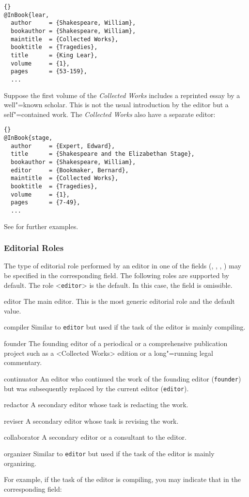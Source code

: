 \documentclass{ltxdockit}[2011/03/25]
\begin{document}
\begin{lstlisting}[style=bibtex]{}
@InBook{lear,
  author     = {Shakespeare, William},
  bookauthor = {Shakespeare, William},
  maintitle  = {Collected Works},
  booktitle  = {Tragedies},
  title      = {King Lear},
  volume     = {1},
  pages      = {53-159},
  ...
\end{lstlisting}
%
Suppose the first volume of the \emph{Collected Works} includes a reprinted essay by a well"=known scholar. This is not the usual introduction by the editor but a self"=contained work. The \emph{Collected Works} also have a separate editor:

\begin{lstlisting}[style=bibtex]{}
@InBook{stage,
  author     = {Expert, Edward},
  title      = {Shakespeare and the Elizabethan Stage},
  bookauthor = {Shakespeare, William},
  editor     = {Bookmaker, Bernard},
  maintitle  = {Collected Works},
  booktitle  = {Tragedies},
  volume     = {1},
  pages      = {7-49},
  ...
\end{lstlisting}
%
See  for further examples.

\subsubsection{Editorial Roles}
\label{bib:use:edr}

The type of editorial role performed by an editor in one of the  fields (\ie {}, , , ) may be specified in the corresponding  field. The following roles are supported by default. The role <\texttt{editor}> is the default. In this case, the  field is omissible.

\begin{marglist}
\setlength{\itemsep}{0pt}
\item[editor] The main editor. This is the most generic editorial role and the default value.
\item[compiler] Similar to \texttt{editor} but used if the task of the editor is mainly compiling.
\item[founder] The founding editor of a periodical or a comprehensive publication project such as a <Collected Works> edition or a long"=running legal commentary.
\item[continuator] An editor who continued the work of the founding editor (\texttt{founder}) but was subsequently replaced by the current editor (\texttt{editor}).
\item[redactor] A secondary editor whose task is redacting the work.
\item[reviser] A secondary editor whose task is revising the work.
\item[collaborator] A secondary editor or a consultant to the editor.
\item[organizer] Similar to \texttt{editor} but used if the task of the editor is mainly organizing.
\end{marglist}
%
For example, if the task of the editor is compiling, you may indicate that in the corresponding  field:
\end{document}

